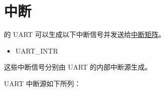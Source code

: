 \documentclass[main\_\_CN.tex]{subfiles}
\begin{document}
\section{中断}


\chipname{} 的 UART 可以生成以下中断信号并发送给\hyperref[mod:intmtrx]{中断矩阵}。

    \begin{itemize}
        \item { UART\_INTR}
    \end{itemize}

这些中断信号分别由 UART 的内部中断源生成。

UART 中断源如下所列：
\end{document}
